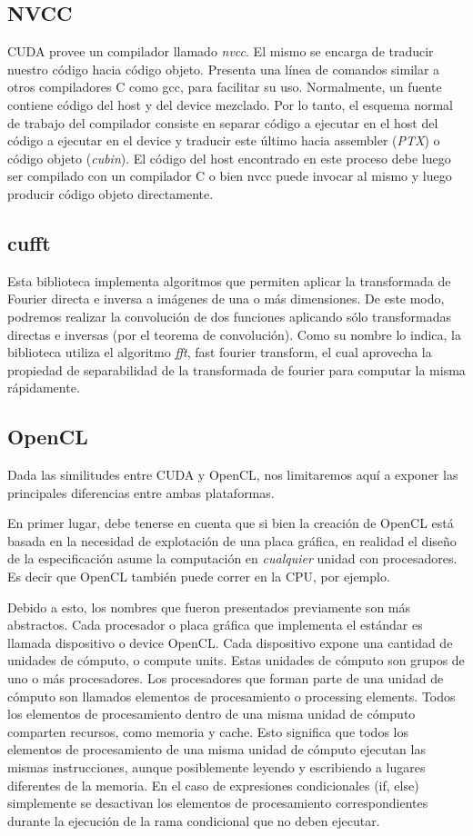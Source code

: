 \subsection{NVCC}
CUDA provee un compilador llamado {\em nvcc}.
El mismo se encarga de traducir nuestro c\'odigo hacia c\'odigo objeto.
Presenta una l\'inea de comandos similar a otros compiladores C como gcc, para facilitar su uso.
Normalmente, un fuente contiene c\'odigo del host y del device mezclado.
Por lo tanto, el esquema normal de trabajo del compilador consiste en separar c\'odigo a ejecutar en el host del c\'odigo a ejecutar en el device y traducir este \'ultimo hacia assembler ({\em PTX}) o c\'odigo objeto ({\em cubin}).
El c\'odigo del host encontrado en este proceso debe luego ser compilado con un compilador C o bien nvcc puede invocar al mismo y luego producir c\'odigo objeto directamente.

\subsection{cufft}
Esta biblioteca implementa algoritmos que permiten aplicar la transformada de Fourier directa e inversa a im\'agenes de una o m\'as dimensiones.
De este modo, podremos realizar la convoluci\'on de dos funciones aplicando s\'olo transformadas directas e inversas (por el teorema de convoluci\'on).
Como su nombre lo indica, la biblioteca utiliza el algoritmo {\em fft}, fast fourier transform, el cual aprovecha la propiedad de separabilidad de la transformada de fourier para computar la misma rápidamente.


\subsection{OpenCL}
Dada las similitudes entre CUDA y OpenCL, nos limitaremos aquí a exponer las principales diferencias entre ambas plataformas.

En primer lugar, debe tenerse en cuenta que si bien la creación de OpenCL está basada en la necesidad de explotación de una placa gráfica, en realidad el diseño de la especificación asume la computación en {\em cualquier} unidad con procesadores.
Es decir que OpenCL también puede correr en la CPU, por ejemplo.

Debido a esto, los nombres que fueron presentados previamente son más abstractos.
Cada procesador o placa gráfica que implementa el estándar es llamada dispositivo o device OpenCL. Cada dispositivo expone una cantidad de unidades de cómputo, o compute units. Estas unidades de cómputo son grupos de uno o más procesadores.
Los procesadores que forman parte de una unidad de cómputo son llamados elementos
de procesamiento o processing elements.
Todos los elementos de procesamiento dentro de una misma unidad de cómputo comparten recursos, como memoria y cache.
Esto significa que todos los elementos de procesamiento de una misma unidad de cómputo ejecutan las mismas instrucciones, aunque posiblemente leyendo y escribiendo a lugares diferentes de la memoria. En el caso de expresiones condicionales (if, else) simplemente se desactivan los elementos de procesamiento correspondientes durante la ejecución de la rama condicional que no deben ejecutar.

